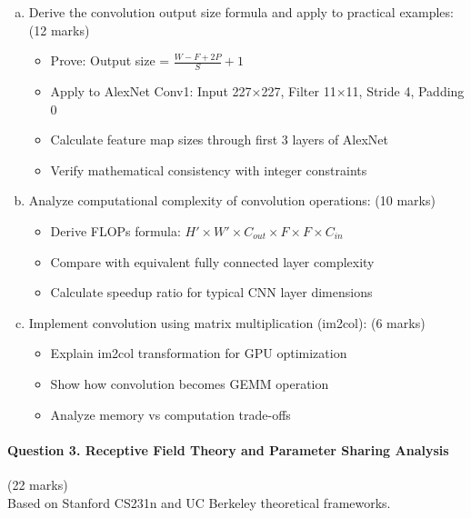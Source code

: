 \documentclass[12pt]{article}
\newcommand{\shortanswer}{\vspace{2cm}}
\newcommand{\mediumanswer}{\vspace{3cm}}
\newcommand{\journalspace}{\vspace{4.5cm}}
\begin{document}
\begin{enumerate}[(a)]
    \item Derive the convolution output size formula and apply to practical examples: \hfill (12 marks)
    \begin{itemize}
        \item Prove: Output size = $\frac{W - F + 2P}{S} + 1$
        \item Apply to AlexNet Conv1: Input 227×227, Filter 11×11, Stride 4, Padding 0
        \item Calculate feature map sizes through first 3 layers of AlexNet
        \item Verify mathematical consistency with integer constraints
    \end{itemize}
    
    \journalspace
    
    \item Analyze computational complexity of convolution operations: \hfill (10 marks)
    \begin{itemize}
        \item Derive FLOPs formula: $H' \times W' \times C_{out} \times F \times F \times C_{in}$
        \item Compare with equivalent fully connected layer complexity
        \item Calculate speedup ratio for typical CNN layer dimensions
    \end{itemize}
    
    \mediumanswer
    
    \item Implement convolution using matrix multiplication (im2col): \hfill (6 marks)
    \begin{itemize}
        \item Explain im2col transformation for GPU optimization
        \item Show how convolution becomes GEMM operation
        \item Analyze memory vs computation trade-offs
    \end{itemize}
    
    \shortanswer
\end{enumerate}

\newpage
\paragraph{Question 3. Receptive Field Theory and Parameter Sharing Analysis}{{\hfill (22 marks)}}\\
Based on Stanford CS231n and UC Berkeley theoretical frameworks.
\end{document}

